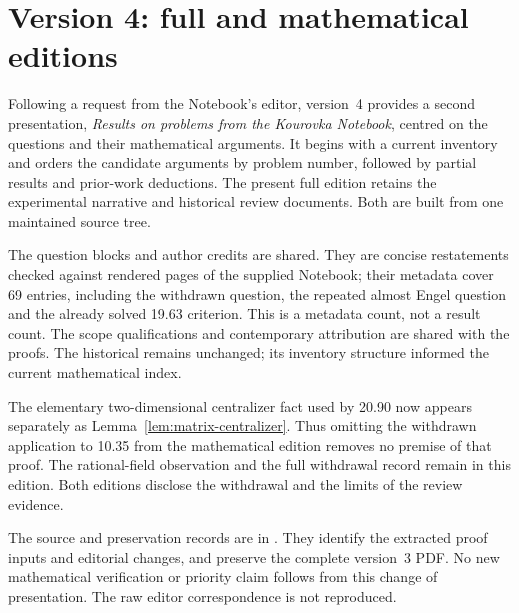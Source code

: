 \section{Version 4: full and mathematical editions}
\label{app:two-editions}
Following a request from the Notebook's editor, version~4 provides a
second presentation, \emph{Results on problems from the Kourovka Notebook},
centred on the questions and their mathematical arguments. It begins
with a current inventory and orders the candidate arguments by problem
number, followed by partial results and prior-work deductions. The
present full edition retains the experimental narrative and historical
review documents. Both are built from one maintained source tree.

The question blocks and author credits are shared. They are concise
restatements checked against rendered pages of the supplied Notebook;
their metadata cover 69 entries, including the withdrawn question,
the repeated almost Engel question and the already solved 19.63
criterion. This is a metadata count, not a result count. The scope
qualifications and contemporary attribution are shared with the proofs.
The historical  remains unchanged;
its inventory structure informed the current mathematical index.

The elementary two-dimensional centralizer fact used by 20.90 now
appears separately as Lemma~\ref{lem:matrix-centralizer}. Thus omitting
the withdrawn application to 10.35 from the mathematical edition removes
no premise of that proof. The rational-field observation and the full
withdrawal record remain in this edition. Both editions disclose the
withdrawal and the limits of the review evidence.

The source and preservation records are in
. They identify the extracted proof
inputs and editorial changes, and preserve the complete version~3 PDF.
No new mathematical verification or priority claim follows from this
change of presentation. The raw editor correspondence is not reproduced.
